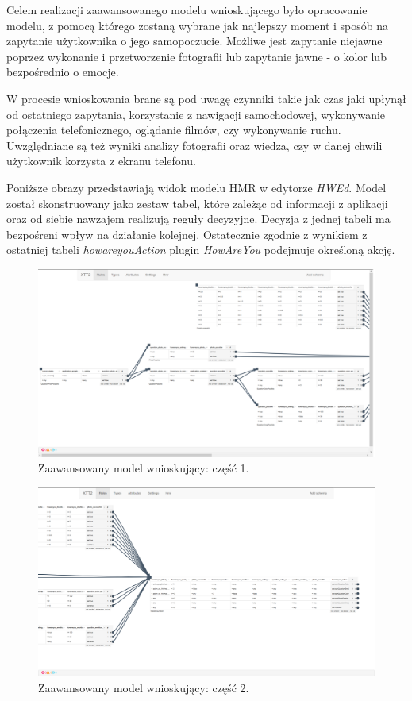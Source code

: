 Celem realizacji zaawansowanego modelu wnioskującego było opracowanie modelu, z pomocą którego zostaną wybrane jak najlepszy moment i sposób na zapytanie użytkownika o jego samopoczucie. Możliwe jest zapytanie niejawne poprzez wykonanie i przetworzenie fotografii lub zapytanie jawne - o kolor lub bezpośrednio o emocje.

W procesie wnioskowania brane są pod uwagę czynniki takie jak czas jaki upłynął od ostatniego zapytania, korzystanie z nawigacji samochodowej, wykonywanie połączenia telefonicznego, oglądanie filmów, czy wykonywanie ruchu. Uwzględniane są też wyniki analizy fotografii oraz wiedza, czy w danej chwili użytkownik korzysta z ekranu telefonu.

Poniższe obrazy przedstawiają widok modelu HMR w edytorze \textit{HWEd}. Model został skonstruowany jako zestaw tabel, które zależąc od informacji z aplikacji oraz od siebie nawzajem realizują reguły decyzyjne. Decyzja z jednej tabeli ma bezpośreni wpływ na działanie kolejnej. Ostatecznie zgodnie z wynikiem z ostatniej tabeli \textit{howareyouAction} plugin \textit{HowAreYou} podejmuje określoną akcję.

\begin{figure}[H]
	\centering
	\includegraphics[scale=0.8]{rozdzial4/HMR_advancedModelPart1.png}
	\caption{Zaawansowany model wnioskujący: część 1.}
\end{figure}

\begin{figure}[H]
\centering
\includegraphics[scale=0.8]{rozdzial4/HMR_advancedModelPart2.png}
\caption{Zaawansowany model wnioskujący: część 2.}
\end{figure}

